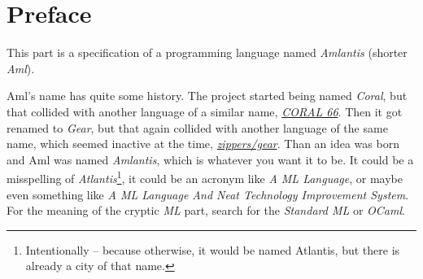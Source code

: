 
\section*{Preface}

This part is a specification of a programming language named {\em Amlantis} (shorter {\em Aml}). 

Aml's name has quite some history. The project started being named {\em Coral}, but that collided with another language of a similar name, \href{https://en.wikipedia.org/wiki/Coral_66}{{\em CORAL 66}}. Then it got renamed to {\em Gear}, but that again collided with another language of the same name, which seemed inactive at the time, \href{https://github.com/zippers/gear}{{\em zippers/gear}}. Than an idea was born and Aml was named {\em Amlantis}, which is whatever you want it to be. It could be a misspelling of {\em Atlantis}\footnote{Intentionally -- because otherwise, it would be named Atlantis, but there is already a city of that name.}, it could be an acronym like {\em A ML Language}, or maybe even something like {\em A ML Language And Neat Technology Improvement System}. For the meaning of the cryptic {\em ML} part, search for the {\em Standard ML} or {\em OCaml}. 






